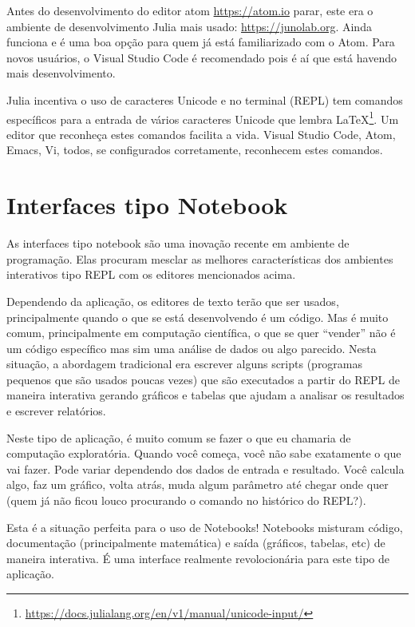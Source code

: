 \documentclass[
  notoc %
]{tufte-book}
\DeclareRobustCommand{\href}[2]{#2\footnote{\url{#1}}}
\begin{document}
Antes do desenvolvimento do editor atom \url{https://atom.io} parar,
este era o ambiente de desenvolvimento Julia mais usado:
\url{https://junolab.org}. Ainda funciona e é uma boa opção para quem já
está familiarizado com o Atom. Para novos usuários, o Visual Studio Code
é recomendado pois é aí que está havendo mais desenvolvimento.

Julia incentiva o uso de caracteres Unicode e no terminal (REPL) tem
\href{https://docs.julialang.org/en/v1/manual/unicode-input/}{comandos
específicos para a entrada de vários caracteres Unicode que lembra
LaTeX}. Um editor que reconheça estes comandos facilita a vida. Visual
Studio Code, Atom, Emacs, Vi, todos, se configurados corretamente,
reconhecem estes comandos.

\hypertarget{sec:notebook}{%
\section{Interfaces tipo Notebook}\label{sec:notebook}}

As interfaces tipo notebook são uma inovação recente em ambiente de
programação. Elas procuram mesclar as melhores características dos
ambientes interativos tipo REPL com os editores mencionados acima.

Dependendo da aplicação, os editores de texto terão que ser usados,
principalmente quando o que se está desenvolvendo é um código. Mas é
muito comum, principalmente em computação científica, o que se quer
``vender'' não é um código específico mas sim uma análise de dados ou
algo parecido. Nesta situação, a abordagem tradicional era escrever
alguns scripts (programas pequenos que são usados poucas vezes) que são
executados a partir do REPL de maneira interativa gerando gráficos e
tabelas que ajudam a analisar os resultados e escrever relatórios.

Neste tipo de aplicação, é muito comum se fazer o que eu chamaria de
computação exploratória. Quando você começa, você não sabe exatamente o
que vai fazer. Pode variar dependendo dos dados de entrada e resultado.
Você calcula algo, faz um gráfico, volta atrás, muda algum parâmetro até
chegar onde quer (quem já não ficou louco procurando o comando no
histórico do REPL?).

Esta é a situação perfeita para o uso de Notebooks! Notebooks misturam
código, documentação (principalmente matemática) e saída (gráficos,
tabelas, etc) de maneira interativa. É uma interface realmente
revolocionária para este tipo de aplicação.
\end{document}
